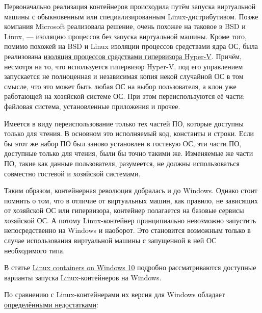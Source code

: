 \documentclass[14pt, a4paper]{article}
\begin{document}
Первоначально реализация контейнеров происходила путём запуска виртуальной машины с
обыкновенным или специализированным Linux-дистрибутивом. Позже компания Microsoft
реализовала решение, очень похожее на таковое в BSD и Linux, — изоляцию процессов без запуска
виртуальной машины. Кроме того, помимо похожей на BSD и Linux изоляции процессов средствами
ядра ОС, была реализована \href{https://docs.microsoft.com/en-us/archive/msdn-magazine/2017/april/containers-bringing-docker-to-windows-developers-with-windows-server-containers}{изоляция процессов средствами гипервизора Hyper-V}. Причём, несмотря
на то, что используется гипервизор Hyper-V, под его управлением запускается не полноценная и
независимая копия некой случайной ОС в том смысле, что это может быть любая ОС на выбор
пользователя, а клон уже работающей на хозяйской системе ОС. При этом переиспользуются её
части: файловая система, установленные приложения и прочее.

Имеется в виду переиспользование только тех частей ПО, которые доступны только для чтения. В
основном это исполняемый код, константы и строки. Если бы этот же набор ПО был заново
установлен в гостевую ОС, эти части ПО, доступные только для чтения, были бы точно такими же.
Изменяемые же части ПО, такие как данные пользователя, разумеется, не должны использоваться
совместно гостевой и хозяйской системами.

Таким образом, контейнерная революция добралась и до Windows. Однако стоит помнить о том, что в
отличие от виртуальных машин, как правило, не зависящих от хозяйской ОС или гипервизора,
контейнер полагается на базовые сервисы хозяйской ОС. А потому Linux-контейнер принципиально
невозможно запустить непосредственно на Windows и наоборот. Это становится возможным только в
случае использования виртуальной машины с запущенной в ней ОС необходимого типа.

В статье \href{https://docs.microsoft.com/en-us/virtualization/windowscontainers/deploy-containers/linux-containers.}{Linux containers on Windows 10} подробно рассматриваются доступные варианты запуска
Linux-контейнеров на Windows.

По сравнению с Linux-контейнерами их версия для Windows обладает \href{https://containerjournal.com/topics/container-ecosystems/why-windows-containers-are-less-attractive-than-linux-containers/}{определёнными недостатками}:
\end{document}
